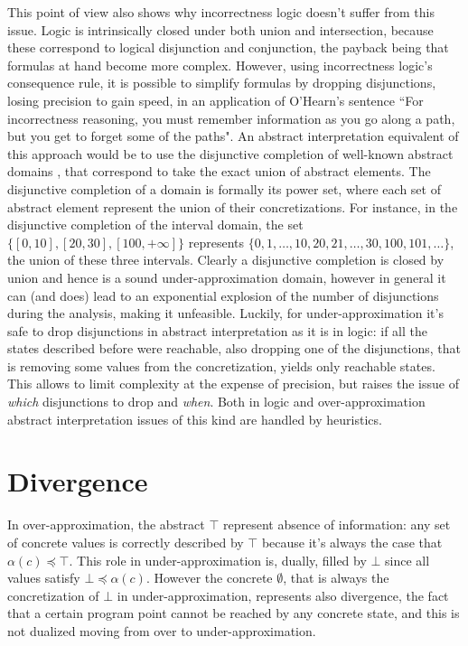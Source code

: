 This point of view also shows why incorrectness logic doesn't suffer from this issue. Logic is intrinsically closed under both union and intersection, because these correspond to logical disjunction and conjunction, the payback being that formulas at hand become more complex. However, using incorrectness logic's consequence rule, it is possible to simplify formulas by dropping disjunctions, losing precision to gain speed, in an application of O'Hearn's sentence \cite{ohearn-incorrectness-logic} ``For incorrectness reasoning, you must remember information as you go along a path, but you get to forget some of the paths".
An abstract interpretation equivalent of this approach would be to use the disjunctive completion of well-known abstract domains \cite{under-approx-disjunctive-completion}, that correspond to take the exact union of abstract elements. The disjunctive completion of a domain is formally its power set, where each set of abstract element represent the union of their concretizations. For instance, in the disjunctive completion of the interval domain, the set $\{ [0, 10], [20, 30], [100, +\infty] \}$ represents $\{ 0, 1, \dots, 10, 20, 21, \dots, 30, 100, 101, \dots \}$, the union of these three intervals. Clearly a disjunctive completion is closed by union and hence is a sound under-approximation domain, however in general it can (and does) lead to an exponential explosion of the number of disjunctions during the analysis, making it unfeasible. Luckily, for under-approximation it's safe to drop disjunctions in abstract interpretation as it is in logic: if all the states described before were reachable, also dropping one of the disjunctions, that is removing some values from the concretization, yields only reachable states. This allows to limit complexity at the expense of precision, but raises the issue of \textit{which} disjunctions to drop and \textit{when}. Both in logic and over-approximation abstract interpretation issues of this kind are handled by heuristics.

\section{Divergence}
In over-approximation, the abstract $\top$ represent absence of information: any set of concrete values is correctly described by $\top$ because it's always the case that $\alpha(c) \preceq \top$. This role in under-approximation is, dually, filled by $\bot$ since all values satisfy $\bot \preceq \alpha(c)$.
However the concrete $\emptyset$, that is always the concretization of $\bot$ in under-approximation, represents also divergence, the fact that a certain program point cannot be reached by any concrete state, and this is not dualized moving from over to under-approximation.

